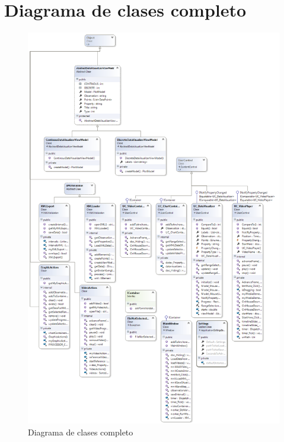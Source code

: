 \chapter{Diagrama de clases completo}
\label{chap:DiagramaDeClasesCompleto}
\begin{figure}[h]
\centering
\includegraphics[width=1.05\linewidth]{./Figures/ClassDiagramExpanded}
\caption{Diagrama de clases completo}
\label{fig:ClassDiagramExpanded}
\end{figure}
